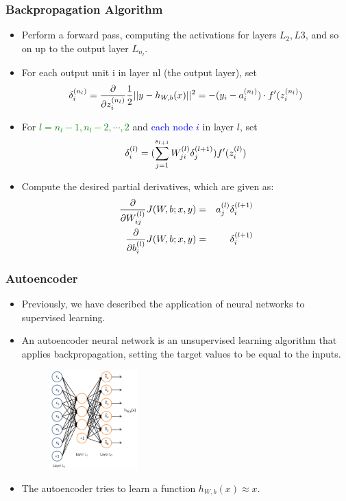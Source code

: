 \documentclass{beamer}
\newcommand{\tb}[1]{\textcolor{blue}{#1}} %
\newcommand{\tg}[1]{\textcolor{green}{#1}} %
\newcommand{\beq}[1]{\vspace{-0.02in}\begin{equation}#1\end{equation}\vspace{-0.02in}}
\newcommand{\beqn}[1]{\vspace{-0.03in}\begin{eqnarray}#1\end{eqnarray}\vspace{-0.03in}}
\begin{document}
\begin{frame}
\frametitle{Backpropagation Algorithm}
\begin{itemize}
\item Perform a forward pass, computing the activations for layers $L_2, L3$, and so on up to the output layer $L_{n_l}$.
\item For each output unit i in layer nl (the output layer), set
\beq{\small
\delta_i^{(n_l)}=\frac{\partial}{\partial z_i^{(n_l)}} \frac{1}{2} ||y-h_{W,b}(x)||^2=-(y_i-a_i^{(n_l)})\cdot f'(z_i^{(n_l)})
}
\item For \tg{$l = n_l-1, n_l-2, \cdots, 2$} and \tb{each node $i$} in layer $l$, set
\beq{\small
\delta_i^{(l)}=(\sum_{j=1}^{s_{l+1}}W_{ji}^{(l)}\delta_j^{(l+1)})f'(z_i^{(l)})
}
\item Compute the desired partial derivatives, which are given as:
\beqn{\small
\frac{\partial}{\partial W_{ij}^{(l)}}J(W, b; x, y) &=& a_j^{(l)}\delta_i^{(l+1)} \\
\frac{\partial}{\partial b_i^{(l)}}J(W, b; x, y) &=& \delta_i^{(l+1)}
}
\end{itemize}
\end{frame}

\begin{frame}
\frametitle{Autoencoder}
\begin{itemize}
\item Previously, we have described the application of neural networks to supervised learning.
\item An autoencoder neural network is an unsupervised learning algorithm that applies backpropagation, setting the target values to be equal to the inputs.

\begin{figure}
      \includegraphics[height=3.8cm]{figs/Autoencoder636.png}
\end{figure}

\item The autoencoder tries to learn a function $h_{W,b}(x) \approx x$.
\end{itemize}
\end{frame}
\end{document}

